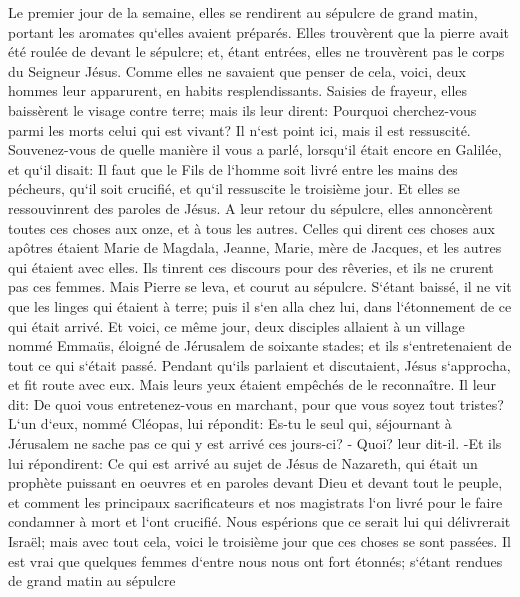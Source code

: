 \verse Le premier jour de la semaine, elles se rendirent au sépulcre de grand matin, portant les aromates qu`elles avaient préparés. 
\verse Elles trouvèrent que la pierre avait été roulée de devant le sépulcre; 
\verse et, étant entrées, elles ne trouvèrent pas le corps du Seigneur Jésus. 
\verse Comme elles ne savaient que penser de cela, voici, deux hommes leur apparurent, en habits resplendissants. 
\verse Saisies de frayeur, elles baissèrent le visage contre terre; mais ils leur dirent: Pourquoi cherchez-vous parmi les morts celui qui est vivant? 
\verse Il n`est point ici, mais il est ressuscité. Souvenez-vous de quelle manière il vous a parlé, lorsqu`il était encore en Galilée, 
\verse et qu`il disait: Il faut que le Fils de l`homme soit livré entre les mains des pécheurs, qu`il soit crucifié, et qu`il ressuscite le troisième jour. 
\verse Et elles se ressouvinrent des paroles de Jésus. 
\verse A leur retour du sépulcre, elles annoncèrent toutes ces choses aux onze, et à tous les autres. 
\verse Celles qui dirent ces choses aux apôtres étaient Marie de Magdala, Jeanne, Marie, mère de Jacques, et les autres qui étaient avec elles. 
\verse Ils tinrent ces discours pour des rêveries, et ils ne crurent pas ces femmes. 
\verse Mais Pierre se leva, et courut au sépulcre. S`étant baissé, il ne vit que les linges qui étaient à terre; puis il s`en alla chez lui, dans l`étonnement de ce qui était arrivé. 
\verse Et voici, ce même jour, deux disciples allaient à un village nommé Emmaüs, éloigné de Jérusalem de soixante stades; 
\verse et ils s`entretenaient de tout ce qui s`était passé. 
\verse Pendant qu`ils parlaient et discutaient, Jésus s`approcha, et fit route avec eux. 
\verse Mais leurs yeux étaient empêchés de le reconnaître. 
\verse Il leur dit: De quoi vous entretenez-vous en marchant, pour que vous soyez tout tristes? 
\verse L`un d`eux, nommé Cléopas, lui répondit: Es-tu le seul qui, séjournant à Jérusalem ne sache pas ce qui y est arrivé ces jours-ci? - 
\verse Quoi? leur dit-il. -Et ils lui répondirent: Ce qui est arrivé au sujet de Jésus de Nazareth, qui était un prophète puissant en oeuvres et en paroles devant Dieu et devant tout le peuple, 
\verse et comment les principaux sacrificateurs et nos magistrats l`on livré pour le faire condamner à mort et l`ont crucifié. 
\verse Nous espérions que ce serait lui qui délivrerait Israël; mais avec tout cela, voici le troisième jour que ces choses se sont passées. 
\verse Il est vrai que quelques femmes d`entre nous nous ont fort étonnés; s`étant rendues de grand matin au sépulcre 
